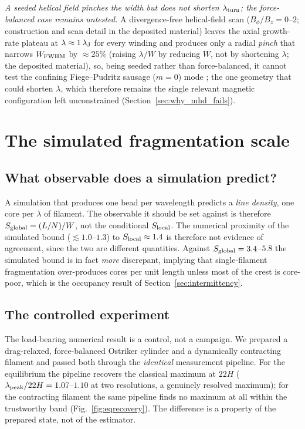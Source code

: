 \documentclass[usenatbib,twoside,twocolumn]{mnras}
\begin{document}
\emph{A seeded helical field pinches the width but does not shorten $\lambda_{\rm turn}$; the force-balanced case remains untested.} A divergence-free helical-field scan ($B_\phi/B_z=0$--$2$; construction and scan detail in the deposited material) leaves the axial growth-rate plateau at $\lambda\approx1\,\lambda_{\rm J}$ for every winding and produces only a radial \emph{pinch} that narrows $W_{\rm FWHM}$ by $\approx25\%$ (raising $\lambda/W$ by reducing $W$, not by shortening $\lambda$; the deposited material), so, being seeded rather than force-balanced, it cannot test the confining Fiege--Pudritz sausage ($m=0$) mode \citep{Fiege2000}; the one geometry that could shorten $\lambda$, which therefore remains the single relevant magnetic configuration left unconstrained (Section~\ref{sec:why_mhd_fails}).





\section{The simulated fragmentation scale}
\label{sec:validation_endtoend}

\subsection{What observable does a simulation predict?}
\label{sec:whatobservable}

A simulation that produces one bead per wavelength predicts a \emph{line density}, one core per $\lambda$ of filament. The observable it should be set against is therefore $S_{\rm global}=(L/N)/W$, not the conditional $S_{\rm local}$. The numerical proximity of the simulated bound ($\lesssim1.0$--$1.3$) to $S_{\rm local}\approx1.4$ is therefore not evidence of agreement, since the two are different quantities. Against $S_{\rm global}=3.4$--$5.8$ the simulated bound is in fact \emph{more} discrepant, implying that single-filament fragmentation over-produces cores per unit length unless most of the crest is core-poor, which is the occupancy result of Section~\ref{sec:intermittency}.

\subsection{The controlled experiment}
\label{sec:control}

The load-bearing numerical result is a control, not a campaign. We prepared a drag-relaxed, force-balanced Ostriker cylinder and a dynamically contracting filament and passed both through the \emph{identical} measurement pipeline. For the equilibrium the pipeline recovers the classical maximum at $22H$ ($\lambda_{\rm peak}/22H=1.07$--$1.10$ at two resolutions, a genuinely resolved maximum); for the contracting filament the same pipeline finds no maximum at all within the trustworthy band (Fig.~\ref{fig:eqrecovery}). The difference is a property of the prepared state, not of the estimator.
\end{document}
